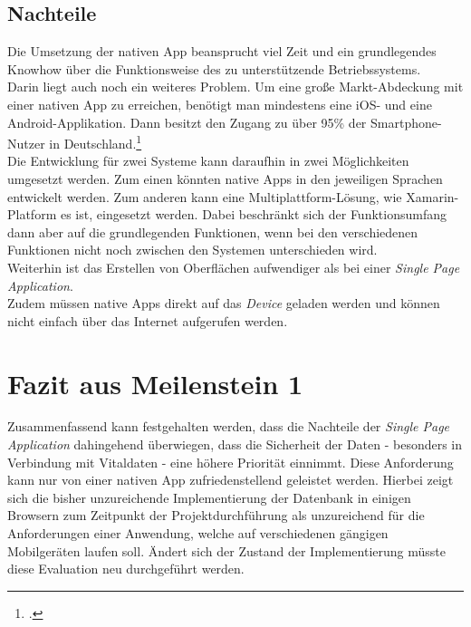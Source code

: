 \subsection{Nachteile}
\label{sec:nachteile-native-app}
Die Umsetzung der nativen App beansprucht viel Zeit und ein grundlegendes Knowhow über die Funktionsweise des zu unterstützende Betriebssystems.\\
Darin liegt auch noch ein weiteres Problem. Um eine große Markt-Abdeckung mit einer nativen App zu erreichen, benötigt man mindestens eine iOS- und eine Android-Applikation. Dann besitzt den Zugang zu über 95\% der Smartphone-Nutzer in Deutschland.\footcite{Statista-SmartphoneVerteilung}\\
Die Entwicklung für zwei Systeme kann daraufhin in zwei Möglichkeiten umgesetzt werden. Zum einen könnten native Apps in den jeweiligen Sprachen entwickelt werden. Zum anderen kann eine Multiplattform-Lösung, wie Xamarin-Platform es ist, eingesetzt werden. Dabei beschränkt sich der Funktionsumfang dann aber auf die grundlegenden Funktionen, wenn bei den verschiedenen Funktionen nicht noch zwischen den Systemen unterschieden wird.\\
Weiterhin ist das Erstellen von Oberflächen aufwendiger als bei einer \textit{Single Page Application}.\\
Zudem müssen native Apps direkt auf das \textit{Device} geladen werden und können nicht einfach über das Internet aufgerufen werden.

\section{Fazit aus Meilenstein 1}
\label{sec:gegenueberstellung-fazit}
Zusammenfassend kann festgehalten werden, dass die Nachteile der \textit{Single Page Application} dahingehend überwiegen, dass die Sicherheit der Daten - besonders in Verbindung mit Vitaldaten - eine höhere Priorität einnimmt. Diese Anforderung kann nur von einer nativen App zufriedenstellend geleistet werden. Hierbei zeigt sich die bisher unzureichende Implementierung der Datenbank in einigen Browsern zum Zeitpunkt der Projektdurchführung als unzureichend für die Anforderungen einer Anwendung, welche auf verschiedenen gängigen Mobilgeräten laufen soll. Ändert sich der Zustand der Implementierung müsste diese Evaluation neu durchgeführt werden. 
